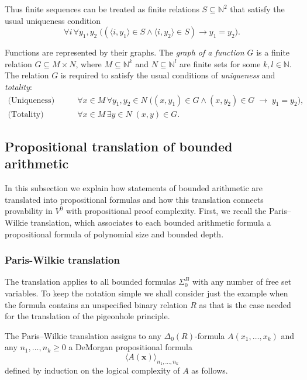 \documentclass{article}
\theoremstyle{plain}
\theoremstyle{definition}
\newcommand{\tuple}{\mathbf}
\begin{document}
Thus finite sequences can be treated as finite relations
\(S \subseteq \mathbb{N}^2\) that satisfy the usual uniqueness condition
\[
\forall i\,\forall y_1,y_2\;
\bigl((\langle i,y_1\rangle \in S \wedge \langle i,y_2\rangle \in S)
\rightarrow y_1=y_2\bigr).
\]


Functions are represented by their graphs.
The \emph{graph of a function \(G\)} is a finite relation
\(G \subseteq M \times N\), where \(M \subseteq \mathbb{N}^k\) and
\(N \subseteq \mathbb{N}^l\) are finite sets for some \(k,l \in \mathbb{N}\).
The relation \(G\) is required to satisfy the usual conditions of
\emph{uniqueness} and \emph{totality}:
\[
\begin{aligned}
\text{(Uniqueness)}\qquad 
&\forall x \in M\, \forall y_1, y_2 \in N\;
   \bigl((x,y_1) \in G \wedge (x,y_2) \in G \;\rightarrow\; y_1 = y_2\bigr), \\[6pt]
\text{(Totality)}\qquad 
&\forall x \in M\, \exists y \in N\; (x,y) \in G.
\end{aligned}
\]



\subsection{Propositional translation of bounded arithmetic}

In this subsection we explain how statements of bounded arithmetic are translated into
propositional formulas and how this translation connects provability in $V^0$ with
propositional proof complexity. First, we recall the Paris--Wilkie translation, which
associates to each bounded arithmetic formula a propositional
formula of polynomial size and bounded depth.

\subsubsection{Paris-Wilkie translation}

The translation applies to all bounded formulas $\Sigma^B_0$ with any number of free set variables. To keep the notation simple we shall consider just the example when the formula contains an unspecified binary relation $R$ as that is the case needed for the translation of the pigeonhole principle. 

The Paris–Wilkie translation \cite[Section~8.2]{krajicek2019} assigns to any $\Delta_0(R)$-formula 
$A(x_1, \ldots, x_k)$ and any $n_1, \ldots, n_k \ge 0$ a DeMorgan propositional formula
\[
\langle A(\tuple{x}) \rangle_{n_1, \ldots, n_k}
\]
defined by induction on the logical complexity of $A$ as follows.
\end{document}
